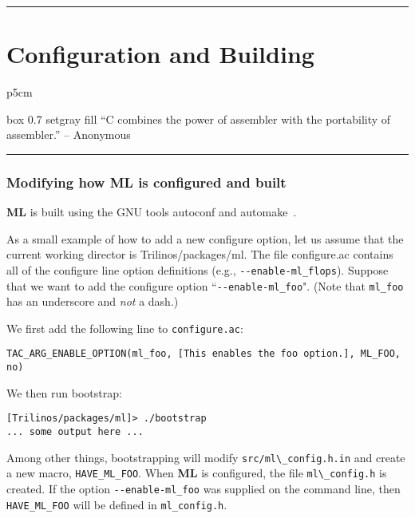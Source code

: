 \documentclass[10pt,letter,relax]{SANDreport}
\newcommand{\HRule}{\noindent\rule{\linewidth}{1mm}}
\newcommand{\ML}     {{\bf ML }}
\begin{document}

\clearpage
\newpage

\vspace*{3cm}
\HRule
\part{Configuration and Building}

\medskip

\hfill
\begin{tabular}{p{5cm}}
\begin{boxitpara}{box 0.7 setgray fill}
``C combines the power of assembler with the portability of assembler.''
                                 -- Anonymous
\end{boxitpara}
\end{tabular}

\HRule
\clearpage
\newpage


\section{Modifying how \ML is configured and built}
\label{sec:configure}

\ML is built using the GNU tools autoconf and automake~\cite{Autoconf,Automake}.

As a small example of how to add a new configure option, let us 
assume that the current working director is Trilinos/packages/ml.
The file configure.ac contains all of the configure line option definitions
(e.g., \verb!--enable-ml_flops!).   Suppose that we want to add the configure option
``\verb!--enable-ml_foo!". (Note that \verb!ml_foo! has an underscore
and {\sl not} a dash.)

We first add the following line to \verb!configure.ac!:
\begin{verbatim}
TAC_ARG_ENABLE_OPTION(ml_foo, [This enables the foo option.], ML_FOO, no)
\end{verbatim}
We then run bootstrap:
\begin{verbatim}
[Trilinos/packages/ml]> ./bootstrap
... some output here ...
\end{verbatim}
Among other things, bootstrapping  will modify
\verb!src/ml\_config.h.in! and create a new macro, \verb!HAVE_ML_FOO!.
When \ML is configured, the file \verb!ml\_config.h! is created.
If the option \verb!--enable-ml_foo! was supplied on the command line, then
\verb!HAVE_ML_FOO! will be defined in \verb!ml_config.h!.
\end{document}
